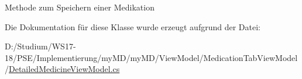 Methode zum Speichern einer Medikation 



Die Dokumentation für diese Klasse wurde erzeugt aufgrund der Datei\+:\begin{DoxyCompactItemize}
\item 
D\+:/\+Studium/\+W\+S17-\/18/\+P\+S\+E/\+Implementierung/my\+M\+D/my\+M\+D/\+View\+Model/\+Medication\+Tab\+View\+Model/\mbox{\hyperlink{_detailed_medicine_view_model_8cs}{Detailed\+Medicine\+View\+Model.\+cs}}\end{DoxyCompactItemize}
